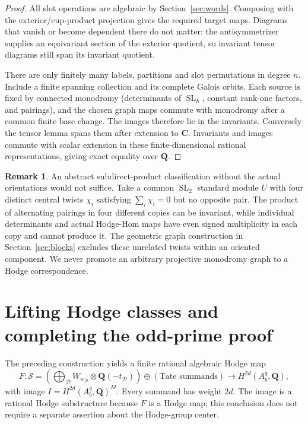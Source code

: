 \documentclass[11pt]{article}
\theoremstyle{definition}
\newtheorem{remark}[theorem]{Remark}
\newcommand{\Q}{\mathbf Q}
\newcommand{\C}{\mathbf C}
\newcommand{\SL}{\operatorname{SL}}
\begin{document}
\begin{proof}
All slot operations are algebraic by Section~\ref{sec:words}. Composing
with the exterior/cup-product projection gives the required target maps.
Diagrams that vanish or become dependent there do not matter: the
antisymmetrizer supplies an equivariant section of the exterior quotient,
so invariant tensor diagrams still span its invariant quotient.

There are only finitely many labels, partitions and slot permutations in
degree $n$. Include a finite spanning collection and its complete Galois
orbits. Each source is fixed by connected monodromy (determinants of
$\SL_h$, constant rank-one factors, and pairings), and the chosen graph
maps commute with monodromy after a common finite base change. The images
therefore lie in the invariants. Conversely the tensor lemma spans them
after extension to $\C$. Invariants and images commute with scalar
extension in these finite-dimensional rational representations, giving
exact equality over $\Q$.
\end{proof}

\begin{remark}
An abstract subdirect-product classification without the actual orientations
would not suffice. Take a common $\SL_2$ standard module $U$ with four
distinct central twists $\chi_i$ satisfying $\sum_i\chi_i=0$ but no
opposite pair. The product of alternating pairings in four different copies
can be invariant, while individual determinants and actual Hodge-Hom maps
have even signed multiplicity in each copy and cannot produce it. The
geometric graph construction in Section~\ref{sec:blocks} excludes these
unrelated twists within an oriented component. We never promote an
arbitrary projective monodromy graph to a Hodge correspondence.
\end{remark}

\section{Lifting Hodge classes and completing the odd-prime proof}\label{sec:lift}
The preceding construction yields a finite rational algebraic Hodge map
\begin{equation}\label{eq:surjection}
 F:\mathcal S=
 \left(\bigoplus_{\mathcal D}W_{w_{\mathcal D}}\otimes\Q(-t_{\mathcal D})\right)
 \oplus\left(\text{Tate summands}\right)
 \longrightarrow H^{2d}(A_b^q,\Q),
\end{equation}
with image $I=H^{2d}(A_b^q,\Q)^M$. Every summand has weight $2d$.
The image is a rational Hodge substructure because $F$ is a Hodge map;
this conclusion does not require a separate assertion about the Hodge-group
center.
\end{document}
